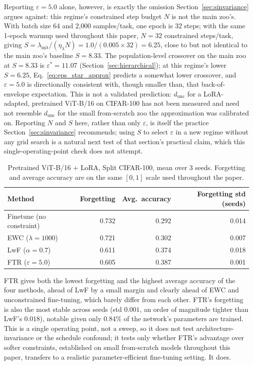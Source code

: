 \documentclass[11pt]{article}
\newcommand{\eps}{\varepsilon}
\newcommand{\epsstar}{\eps^{*}}
\begin{document}
Reporting $\eps=5.0$ alone, however, is exactly the omission
Section~\ref{sec:sinvariance} argues against: this regime's constrained
step budget $N$ is not the main zoo's. With batch size 64 and 2{,}000
samples/task, one epoch is 32 steps; with the same 1-epoch warmup used
throughout this paper, $N=32$ constrained steps/task, giving
$S=\lambda_{\mathrm{init}}/(\eta_\lambda N)=1.0/(0.005\times32)=6.25$,
close to but not identical to the main zoo's baseline $S=8.33$. The
population-level crossover on the main zoo at $S=8.33$ is
$\epsstar=11.07$ (Section~\ref{sec:hierarchical}); at this regime's
lower $S=6.25$, Eq.~\ref{eq:eps_star_approx} predicts a somewhat lower
crossover, and $\eps=5.0$ is directionally consistent with, though smaller
than, that back-of-envelope expectation. This is not a
validated prediction: $d_{\mathrm{unc}}$ for a LoRA-adapted, pretrained
ViT-B/16 on CIFAR-100 has not been measured and need not resemble
$d_{\mathrm{unc}}$ for the small from-scratch zoo the approximation was
calibrated on. Reporting $N$ and $S$ here, rather than only $\eps$, is
itself the practice Section~\ref{sec:sinvariance} recommends; using $S$ to
select $\eps$ in a new regime without any grid search is a natural next
test of that section's practical claim, which this single-operating-point
check does not attempt.

\begin{table}[h]
\centering
\caption{Pretrained ViT-B/16 + LoRA, Split CIFAR-100, mean over 3 seeds.
Forgetting and average accuracy are on the same $[0,1]$ scale used
throughout the paper.}
\label{tab:pretrained}
\begin{tabular}{lrrr}
\toprule
Method & Forgetting & Avg.\ accuracy & Forgetting std (seeds) \\
\midrule
Finetune (no constraint) & 0.732 & 0.292 & 0.014 \\
EWC ($\lambda=1000$)     & 0.721 & 0.302 & 0.007 \\
LwF ($\alpha=0.7$)       & 0.611 & 0.374 & 0.018 \\
FTR ($\eps=5.0$)         & 0.605 & 0.387 & 0.001 \\
\bottomrule
\end{tabular}
\end{table}

FTR gives both the lowest forgetting and the highest average accuracy of
the four methods, ahead of LwF by a small margin and clearly ahead of EWC
and unconstrained fine-tuning, which barely differ from each other.
FTR's forgetting is also the most stable across seeds (std $0.001$, an
order of magnitude tighter than LwF's $0.018$), notable given only
$0.84\%$ of the network's parameters are trained. This is a single
operating point, not a sweep, so it does not test architecture-invariance
or the schedule confound; it tests only whether FTR's advantage over
softer constraints, established on small from-scratch models throughout
this paper, transfers to a realistic parameter-efficient fine-tuning
setting. It does.
\end{document}
